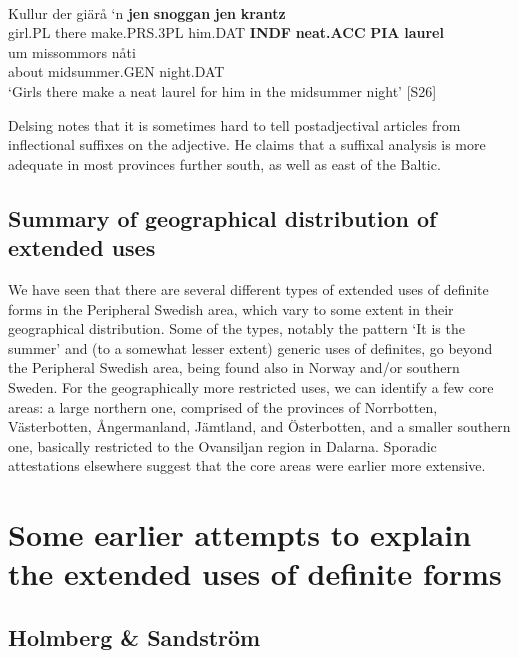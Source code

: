 \ea \label{} 
\\
\gll Kullur  der  giärå  ‘n  \textbf{jen} \textbf{snoggan} \textbf{jen} \textbf{krantz}\\
girl.PL  there  make.PRS.3PL  him.DAT  \textbf{INDF} \textbf{neat.ACC} \textbf{PIA} \textbf{laurel}\\
\gll um  missommors  nåti\\
about  midsummer.GEN  night.DAT\\
\glt ‘Girls there make a neat laurel for him in the midsummer night’ [S26]

\z

Delsing notes that it is sometimes hard to tell postadjectival articles from inflectional suffixes on the adjective. He claims that a suffixal analysis is more adequate in most provinces further south, as well as east of the Baltic. 

\subsection{ Summary of geographical distribution of extended uses}

We have seen that there are several different types of extended uses of definite forms in the Peripheral Swedish area, which vary to some extent in their geographical distribution. Some of the types, notably the pattern  ‘It is the summer’  and (to a somewhat lesser extent) generic uses of definites, go beyond the Peripheral Swedish area, being found also in Norway and/or southern Sweden. For the geographically more restricted uses, we can identify a few core areas: a large northern one, comprised of the provinces of Norrbotten, Västerbotten, Ångermanland, Jämtland, and Österbotten, and a smaller southern one, basically restricted to the Ovansiljan region in Dalarna. Sporadic attestations elsewhere suggest that the core areas were earlier more extensive.

\section{ Some earlier attempts to explain the extended uses of definite forms}
\subsection{ Holmberg \& Sandström}

